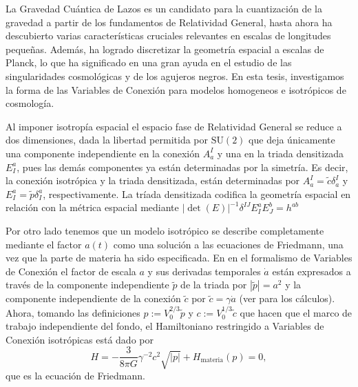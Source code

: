La Gravedad Cu\'{a}ntica de Lazos es un candidato para la cuantizaci\'{o}n de la gravedad a partir de los fundamentos de Relatividad General, hasta ahora ha descubierto varias caracter\'{i}sticas cruciales relevantes en escalas de longitudes peque\~{n}as. Adem\'{a}s, ha logrado discretizar la geometr\'{i}a espacial a escalas de Planck, lo que ha significado en una gran ayuda en el estudio de las singularidades cosmol\'{o}gicas y de los agujeros negros. En esta tesis, investigamos la forma de las Variables de Conexi\'{o}n para modelos homogeneos e isotr\'{o}picos de cosmolog\'{i}a.

Al imponer isotrop\'{i}a espacial el espacio fase de Relatividad General se reduce a dos dimensiones, dada la libertad permitida por $\mathrm{SU}(2)$ que deja \'{u}nicamente una componente independiente en la conexi\'{o}n $A^{I}_{a}$ y una en la triada densitizada $E^{a}_{I}$, pues las dem\'{a}s componentes ya est\'{a}n determinadas por la simetr\'{i}a. Es decir, la conexi\'{o}n isotr\'{o}pica y la triada densitizada, est\'{a}n determinadas por $A^{I}_{a} = \tilde{c} \delta^{I}_{a}$ y $E^{a}_{I} = \tilde{p} \delta^{a}_{I}$, respectivamente. La tr\'{i}ada densitizada codifica la geometr\'{i}a espacial en relaci\'{o}n con la m\'{e}trica espacial mediante $|\det (E)|^{-1} \delta^{IJ} E^{a}_{I} E^{b}_{J} = h^{ab} $

Por otro lado tenemos que un modelo isotr\'{o}pico se describe completamente mediante el factor $a(t)$ como una soluci\'{o}n a las ecuaciones de Friedmann, una vez que la parte de materia ha sido especificada. En en el formalismo de Variables de Conexi\'{o}n el factor de escala $a$ y sus derivadas temporales $\dot{a}$ est\'{a}n expresados a trav\'{e}s de la componente independiente $\tilde{p}$ de la triada por $|\tilde{p}| = a^{2}$ y la componente independiente de la conexi\'{o}n $\tilde{c}$ por $\tilde{c} = \gamma \dot{a}$ (ver \cite{Bojowald2000} para los c\'{a}lculos). Ahora, tomando las definiciones $p := V_{0}^{2/3} \tilde{p}$ y $c := V_{0}^{1/3} \tilde{c}$ que hacen que el marco de trabajo independiente del fondo, el Hamiltoniano restringido a Variables de Conexi\'{o}n isotr\'{o}picas est\'{a} dado por
%
\begin{equation}
H = -\frac{3}{8 \pi G} \gamma^{-2} c^{2} \sqrt{|p|} + H_{\mathrm{materia}} (p) = 0,
\end{equation}
%
que es la ecuaci\'{o}n de Friedmann.

